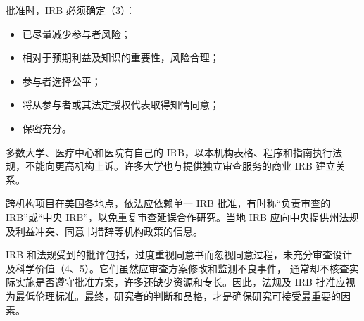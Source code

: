 批准时，IRB 必须确定（3）：
\begin{itemize}
\item 已尽量减少参与者风险；
\item 相对于预期利益及知识的重要性，风险合理；
\item 参与者选择公平；
\item 将从参与者或其法定授权代表取得知情同意；
\item 保密充分。
\end{itemize}
多数大学、医疗中心和医院有自己的 IRB，以本机构表格、程序和指南执行法规，不能向更高机构上诉。许多大学也与提供独立审查服务的商业 IRB 建立关系。

跨机构项目在美国各地点，依法应依赖单一 IRB 批准，有时称“负责审查的 IRB”或“中央 IRB”，以免重复审查延误合作研究。当地 IRB 应向中央提供州法规及利益冲突、同意书措辞等机构政策的信息。

IRB 和法规受到的批评包括，过度重视同意书而忽视同意过程，未充分审查设计及科学价值（4、5）。它们虽然应审查方案修改和监测不良事件，
通常却不核查实际实施是否遵守批准方案，许多还缺少资源和专长。因此，法规及 IRB 批准应视为最低伦理标准。最终，研究者的判断和品格，才是确保研究可接受最重要的因素。

